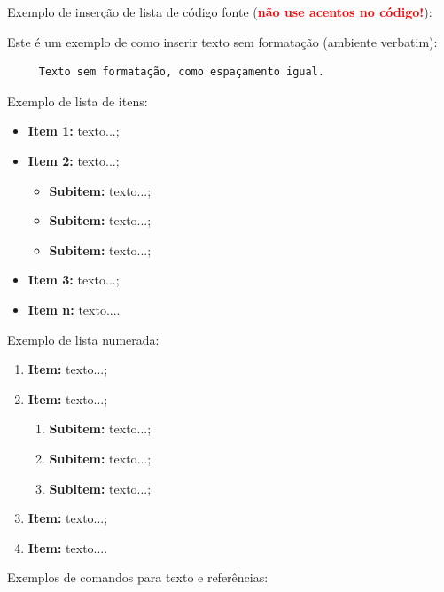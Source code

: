 \documentclass[
	article,			%
	11pt,				%
	oneside,			%
	a4paper,			%
	chapter=TITLE,		%
	section=TITLE,		%
	english,			%
	brazil,				%
	sumario=tradicional
]{abntex2}
\begin{document}
     
     Exemplo de inserção de lista de código fonte (\textbf{\textcolor{red}{não use acentos no código!}}):
     
      
     
     
     
     Este é um exemplo de como inserir texto sem formatação (ambiente verbatim):
     
     \begin{verbatim}
     Texto sem formatação, como espaçamento igual.
     \end{verbatim}
     
     
     Exemplo de lista de itens:
     
     \begin{itemize}
     	\item \textbf{Item 1:} texto...;
     	\item \textbf{Item 2:} texto...;
     	\begin{itemize}
     		\item \textbf{Subitem:} texto...;
     		\item \textbf{Subitem:} texto...;
     		\item \textbf{Subitem:} texto...;
     	\end{itemize}
     	\item \textbf{Item 3:} texto...;
     	\item \textbf{Item n:} texto....
     \end{itemize}
     
     
     Exemplo de lista numerada:
     
     \begin{enumerate}
     	\item \textbf{Item:} texto...;
     	\item \textbf{Item:} texto...;
     	\begin{enumerate}
     		\item \textbf{Subitem:} texto...;
     		\item \textbf{Subitem:} texto...;
     		\item \textbf{Subitem:} texto...;
     	\end{enumerate}
     	\item \textbf{Item:} texto...;
     	\item \textbf{Item:} texto....
     \end{enumerate}
     
     
     Exemplos de comandos para texto e referências:
     
\end{document}

